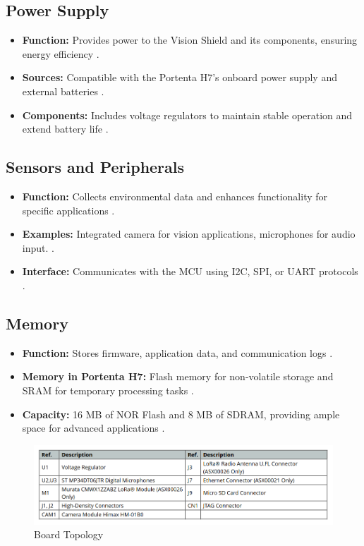 \subsection{Power Supply}
\begin{itemize}
	\item \textbf{Function:} Provides power to the Vision Shield and its components, ensuring energy efficiency .
	\item \textbf{Sources:} Compatible with the Portenta H7’s onboard power supply and external batteries .
	\item \textbf{Components:} Includes voltage regulators to maintain stable operation and extend battery life \cite{arduino_portenta:2025}.
\end{itemize}

\subsection{Sensors and Peripherals}
\begin{itemize}
	\item \textbf{Function:} Collects environmental data and enhances functionality for specific applications .
	\item \textbf{Examples:} Integrated camera for vision applications, microphones for audio input. .
	\item \textbf{Interface:} Communicates with the MCU using I2C, SPI, or UART protocols \cite{arduino_portenta:2025}.
\end{itemize}

\subsection{Memory}
\begin{itemize}
	\item \textbf{Function:} Stores firmware, application data, and communication logs \cite{arduino_portenta:2025}.
	\item \textbf{Memory in Portenta H7:} Flash memory for non-volatile storage and SRAM for temporary processing tasks \cite{arduino_portenta:2025}.
	\item \textbf{Capacity:} 16 MB of NOR Flash and 8 MB of SDRAM, providing ample space for advanced applications \cite{arduino_portenta:2025}.
\end{itemize}

\begin{figure}
	\begin{center}
		\includegraphics[width=0.7\linewidth]{Images/VisionShield/Discription.png}
		\caption{Board Topology}
		\label{BoardTopology}
	\end{center}
\end{figure}

